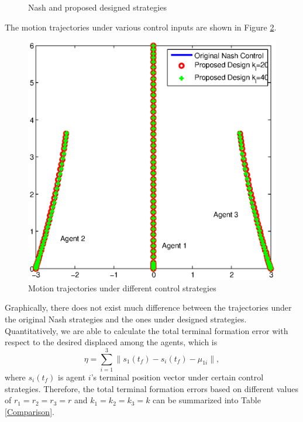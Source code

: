 \documentclass[12pt,draftcls,onecolumn]{IEEEtran}  %
\begin{document}
{\begin{figure}[h]
      \caption{Nash and proposed designed strategies}\label{Original_Distributed_control}
\end{figure}
The motion trajectories under various control inputs are shown in Figure \ref{TrajectoryUndirected}.
\begin{figure}[h]
      \centering
      \includegraphics[scale=0.5]{TrajectoryUndirected.eps}
      \caption{Motion trajectories under different control strategies}\label{TrajectoryUndirected}
\end{figure}
Graphically, there does not exist much difference between the trajectories under the original Nash strategies and the ones under designed strategies. Quantitatively, we are able to calculate the total terminal formation error with respect to the desired displaced among the agents, which is
\begin{equation}
\eta=\sum^3_{i=1}\|s_1(t_f)-s_i(t_f)-{\mu_{1i}}\|,
\end{equation}
where $s_i(t_f)$ is agent $i$'s terminal position vector under certain control strategies. Therefore, the total terminal formation errors based on different values of $r_1=r_2=r_3=r$ and $k_1=k_2=k_3=k$ can be summarized into Table \ref{Comparison}.
\begin{table}[h]\normalsize
\centering
\begin{tabular}{|l|c|c|c|}
  \hline

\end{tabular}
\end{table}}
\end{document}
